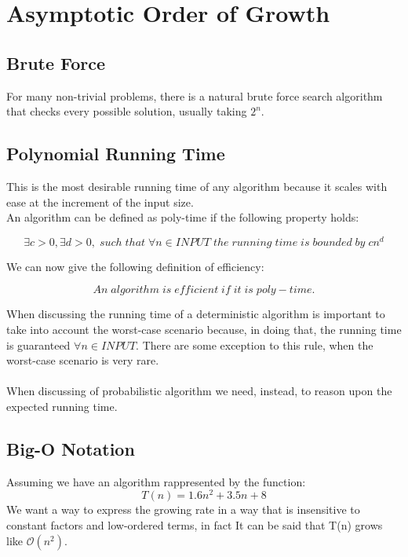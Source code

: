 \section{Asymptotic Order of Growth}

\subsection{Brute Force}
For many non-trivial problems, there is a natural brute force search algorithm that checks every possible solution, usually taking $2^{n}$.
\subsection{Polynomial Running Time}
This is the most desirable running time of any algorithm because it scales with ease at the increment of the input size.\\An algorithm can be defined as poly-time if the following property holds:

\[ \exists c > 0, \exists d >0, \; such \; that \; \forall n \in INPUT \; the \; running \; time \; is \; bounded \; by\; cn^{d} \]

We can now give the following definition of efficiency:

\[ An \; algorithm \; is \; efficient \; if \; it \; is \; poly-time.\]

When discussing the running time of a deterministic algorithm is important to take into account the worst-case scenario because, in doing that, the running time is guaranteed $\forall n \in INPUT.$ There are some exception to this rule, when the worst-case scenario is very rare.\\\\
When discussing of probabilistic algorithm we need, instead, to reason upon the expected running time.

\subsection{Big-O Notation}

Assuming we have an algorithm rappresented by the function:
\[ T(n) = 1.6n^{2} + 3.5n+8\]
We want a way to express the growing rate in a way that is insensitive to constant factors and low-ordered terms, in fact It can be said that T(n) grows like $\mathcal{O}(n^{2})$.\\

